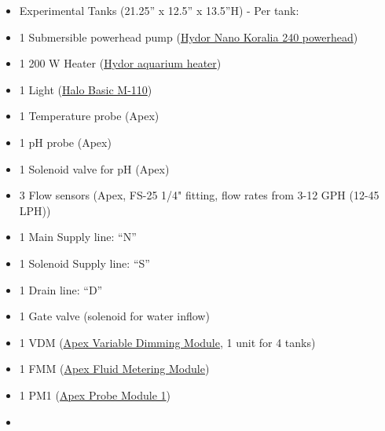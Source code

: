 \documentclass[]{book}
\providecommand{\tightlist}{%
  \setlength{\itemsep}{0pt}\setlength{\parskip}{0pt}}
\begin{document}
\begin{itemize}
\tightlist
\item
  Experimental Tanks (21.25'' x 12.5'' x 13.5''H) - Per tank:\\
\item
  1 Submersible powerhead pump
  (\href{https://github.com/SilbigerLab/Mesocosm_User_Manual/blob/master/Manuals/Hydor_Nano_Pump.pdf}{Hydor
  Nano Koralia 240 powerhead})\\
\item
  1 200 W Heater
  (\href{https://github.com/SilbigerLab/Mesocosm_User_Manual/blob/master/Manuals/Hydor_Heater.pdf}{Hydor
  aquarium heater})\\
\item
  1 Light
  (\href{https://github.com/SilbigerLab/Mesocosm_User_Manual/blob/master/Manuals/Apex_Halo.pdf}{Halo
  Basic M-110})\\
\item
  1 Temperature probe (Apex)\\
\item
  1 pH probe (Apex)\\
\item
  1 Solenoid valve for pH (Apex)\\
\item
  3 Flow sensors (Apex, FS-25 1/4" fitting, flow rates from 3-12 GPH
  (12-45 LPH))\\
\item
  1 Main Supply line: ``N''\\
\item
  1 Solenoid Supply line: ``S''\\
\item
  1 Drain line: ``D''\\
\item
  1 Gate valve (solenoid for water inflow)\\
\item
  1 VDM
  (\href{https://github.com/SilbigerLab/Mesocosm_User_Manual/blob/master/Manuals/VDM_manual.pdf}{Apex
  Variable Dimming Module}, 1 unit for 4 tanks)\\
\item
  1 FMM (\href{https://www.neptunesystems.com/getstarted/fmk/}{Apex
  Fluid Metering Module})\\
\item
  1 PM1
  (\href{https://github.com/SilbigerLab/Mesocosm_User_Manual/blob/master/Manuals/PM1_manual.pdf}{Apex
  Probe Module 1})\\
\item

\end{itemize}
\end{document}
